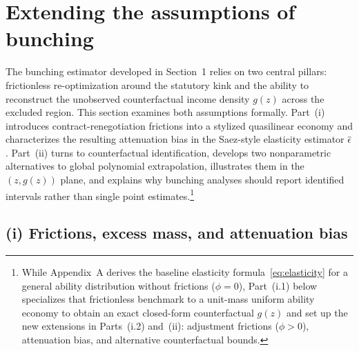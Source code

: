 \section{Extending the assumptions of bunching}

The bunching estimator developed in Section~1 relies on two central pillars: frictionless re-optimization around the statutory kink and the ability to reconstruct the unobserved counterfactual income density $g(z)$ across the excluded region. This section examines both assumptions formally. Part~(i) introduces contract-renegotiation frictions into a stylized quasilinear economy \parencite{chetty2011adjustment} and characterizes the resulting attenuation bias in the Saez-style elasticity estimator $\hat{\epsilon}$. Part~(ii) turns to counterfactual identification, develops two nonparametric alternatives to global polynomial extrapolation, illustrates them in the $(z, g(z))$ plane, and explains why bunching analyses should report identified intervals rather than single point estimates.\footnote{While Appendix~A derives the baseline elasticity formula~\eqref{eq:elasticity} for a general ability distribution without frictions ($\phi = 0$), Part~(i.1) below specializes that frictionless benchmark to a unit-mass uniform ability economy to obtain an exact closed-form counterfactual $g(z)$ and set up the new extensions in Parts~(i.2) and~(ii): adjustment frictions ($\phi > 0$), attenuation bias, and alternative counterfactual bounds.}

\subsection*{(i) Frictions, excess mass, and attenuation bias}

